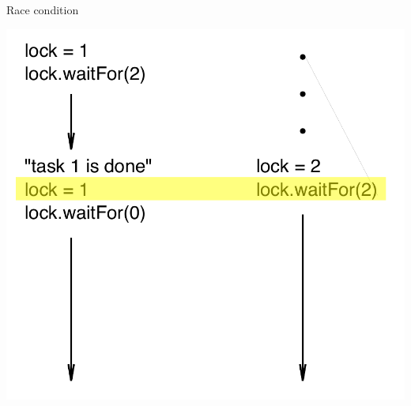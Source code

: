 \documentclass[10pt,xcolor=pdftex,dvipsnames,table]{beamer}
\begin{document}
\begin{frame}{Race condition}
  \begin{center}
    \includegraphics[width=0.65\columnwidth]{raceCondition.pdf}
  \end{center}
\end{frame}
\end{document}
